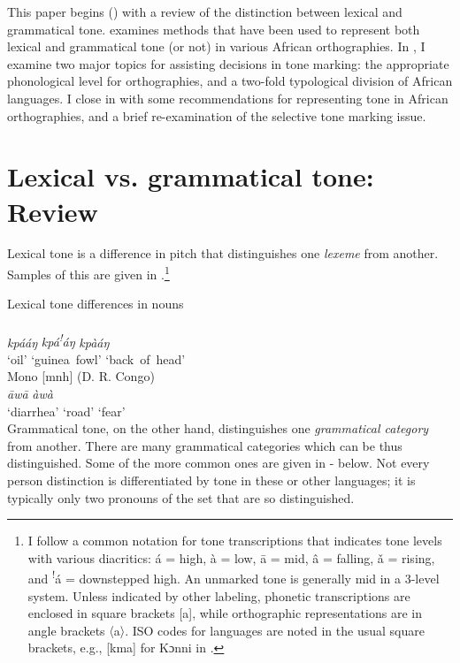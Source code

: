\documentclass[output=paper]{langscibook}
\begin{document}
This paper begins () with a review of the distinction between lexical and grammatical tone.  examines methods that have been used to represent both lexical and grammatical tone (or not) in various African orthographies. In , I examine two major topics for assisting decisions in tone marking: the appropriate phonological level for orthographies, and a two-fold typological division of African languages. I close in  with some recommendations for representing tone in African orthographies, and a brief re-examination of the selective tone marking issue.

\section{Lexical vs. grammatical tone: Review}
\label{sec:LexicalVgrammaticalTone:2}
Lexical tone is a difference in pitch that distinguishes one \textit{lexeme} from another. Samples of this are given in .\footnote{I follow a common notation for tone transcriptions that indicates tone levels with various diacritics: á = high, à = low, ā = mid, â = falling, ǎ = rising, and \textsuperscript{!}á = downstepped high. An unmarked tone is generally mid in a 3-level system. Unless indicated by other labeling, phonetic transcriptions are enclosed in square brackets [a], while orthographic representations are in angle brackets 〈a〉. ISO codes for languages are noted in the usual square brackets, e.g., [kma] for Kɔnni in .}

\ea Lexical tone differences in nouns\\
\label{ex:LexicalToneDifferencesNouns:1}
\ea
{}\\
\gll \textit{kpááŋ} \textit{kpá\textsuperscript{!}}\textit{áŋ} \textit{kpàáŋ}\\
‘oil’ ‘guinea~fowl’ ‘back~of~head’ \\
\ex
Mono [mnh] (D. R. Congo) \citep[198]{Olson2005}\\
 {\textit{\=aw\=a}}  {\textit{àwà}}\\
‘diarrhea’ ‘road’ ‘fear’ \\
\z\z
Grammatical tone, on the other hand, distinguishes one \textit{grammatical category} from another. There are many grammatical categories which can be thus distinguished. Some of the more common ones are given in  -  below. Not every person distinction is differentiated by tone in these or other languages; it is typically only two pronouns of the set that are so distinguished.
\end{document}
